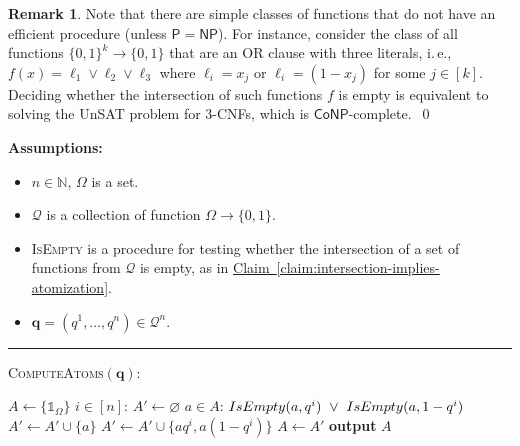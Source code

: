 \documentclass[11pt]{article}
\numberwithin{equation}{section}
\theoremstyle{definition}
\newtheorem{remark}[theorem]{Remark}
\theoremstyle{plain}
\newcommand{\ie}{i.\,e.}
\newcommand{\expref}[2]{\hyperref[#2]{#1~\ref{#2}}}
\theoremstyle{definition}\newtheorem{notation}[theorem]{Notation}\theoremstyle{plain}\raggedbottom
\newcommand{\vsp}{\vspace{0.5em}}
\newcommand{\bbN}{\mathbb{N}}
\newcommand{\cQ}{\mathcal{Q}}
\newcommand{\bq}{\mathbf{q}}
\newcommand{\1}{\mathds{1}}
\newcommand{\numQueries}{n}
\newenvironment{ShadedAlgorithmBox}{\begin{tcolorbox}[colback=myLipicsLightGray,colframe=myLipicsLightGray,arc=-1pt]\begin{minipage}{0.975\textwidth}}{\end{minipage}\end{tcolorbox}}
\begin{document}
\begin{remark}
	Note that there are simple classes of functions that do not have an efficient procedure {} (unless $\mathsf{P} = \mathsf{NP}$). For instance, consider the class of all functions $\{0,1\}^k \to \{0,1\}$ that are an OR clause with three literals, \ie, $f(x) = \ell_1 \vee \ell_2 \vee \ell_3$ where $\ell_i = x_j$ or $\ell_i = (1-x_j)$ for some $j \in [k]$. Deciding whether the intersection of such functions $f$ is empty is equivalent to solving the UnSAT problem for $3$-CNFs, which is $\mathsf{CoNP}$-complete.~\qed
\end{remark}

\begin{algorithmFloat}[H]
	\begin{ShadedAlgorithmBox}
		{\bfseries Assumptions:} 
		\begin{itemize}
			\item{
				$\numQueries \in \bbN$, $\Omega$ is a set.
			}
			\item{
				$\cQ$ is a collection of function $\Omega \to \{0,1\}$.
			}
			\item{
				\textsc{IsEmpty} is a procedure for testing whether the intersection of a set of functions from $\cQ$ is empty, as in \expref{Claim}{claim:intersection-implies-atomization}.
			}
			\item{
				$\bq = \left(q^1,\dots,q^{\numQueries}\right) \in \cQ^n$.
			}
		\end{itemize}
		
		\noindent\rule{\textwidth}{0.5pt}
		
		\vspace*{0.5em}
		
		\textsc{ComputeAtoms}$(\bq)$:
		\begin{algorithmic}
			\vsp
			\State $A \gets \{\1_\Omega\}$
			\vsp
			\For $i \in [\numQueries]$:
				\State $A' \gets \varnothing$
				\For $a \in A$:
					\If $%
							\textsc{IsEmpty}(a,q^i)
						~ \lor ~ 
							\textsc{IsEmpty}(a,1-q^i)
						$
						\State $A' \gets A' \cup \{a\}$
					\Else
						\State $A' \gets A' \cup \{aq^i,a(1-q^i)\}$
					\EndIf
				\EndFor
				\State $A \gets A'$
			\EndFor
			\vsp
			\State \textbf{output} $A$
		\end{algorithmic}
	\end{ShadedAlgorithmBox}
	
	\caption{An algorithm for computing the atoms of a set of statistical queries.}

	\label{algorithm:compute-atoms}
\end{algorithmFloat}
\end{document}
